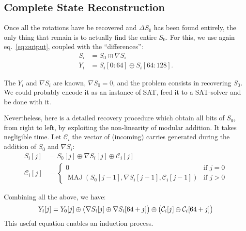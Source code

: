 \documentclass[submission,svgnames,journal=tosc]{iacrtrans}
\DeclareMathOperator{\MAJ}{MAJ}
\begin{document}
\subsection{Complete State Reconstruction}

Once all the rotations have be recovered and $\Delta S_0$ has been found
entirely, the only thing that remain is to actually find the entire $S_0$. For
this, we use again eq.~\eqref{eq:output}, coupled with the ``differences'':
\begin{align*}
  S_i &= S_0 \boxplus \nabla S_i \\
  Y_i &= S_i[0:64] \oplus S_i[64:128].
\end{align*}

The $Y_i$ and $\nabla S_i$ are known, $\nabla S_0 = 0$, and the problem consists
in recovering $S_0$. We could probably encode it as an instance of \textsf{SAT},
feed it to a SAT-solver and be done with it.

Nevertheless, here is a detailed recovery procedure which obtain all bits of
$S_0$, from right to left, by exploiting the non-linearity of modular
addition. It takes negligible time. Let $\mathcal{C}_i$ the vector of (incoming)
carries generated during the addition of $S_0$ and $\nabla S_i$:
\begin{align*}
  S_i[j]           &= S_0[j] \oplus \nabla S_i[j] \oplus \mathcal{C}_i[j]\\
  \mathcal{C}_i[j] &= \begin{cases}
    0 &\text{if } j = 0 \\
    \MAJ(S_0[j-1], \nabla S_i[j-1], \mathcal{C}_i[j-1]) &\text{if } j > 0
  \end{cases}
\end{align*}

Combining all the above, we have:
\begin{equation}\label{eq:master}
  Y_i[j] = Y_0[j] \oplus \bigl( \nabla S_i[j] \oplus \nabla S_i[64+j] \bigr) \oplus \bigl(\mathcal{C}_i[j] \oplus \mathcal{C}_i[64+j]\bigr)\\
\end{equation}
This useful equation enables an induction process.
\end{document}
